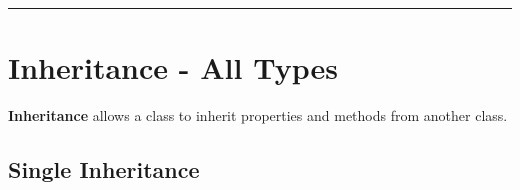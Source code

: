 \begin{center}\rule{0.5\linewidth}{0.5pt}\end{center}

\hypertarget{inheritance---all-types}{%
\section{Inheritance - All Types}\label{inheritance---all-types}}

\textbf{Inheritance} allows a class to inherit properties and methods
from another class.

\hypertarget{single-inheritance}{%
\subsection{Single Inheritance}\label{single-inheritance}}

